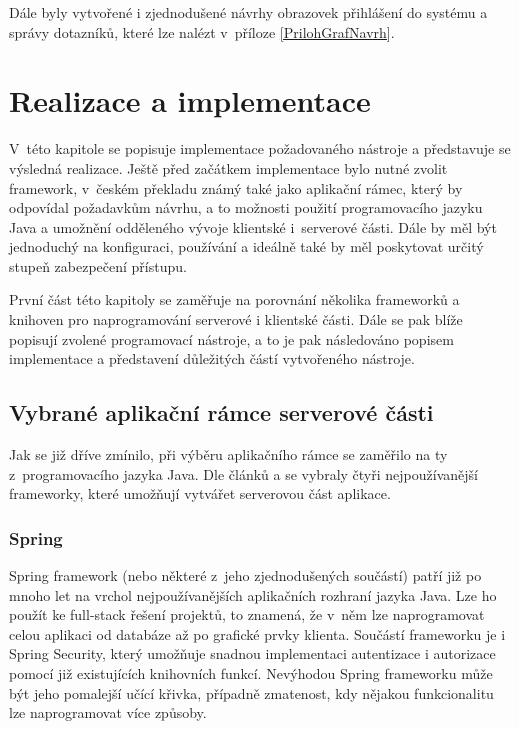 Dále byly vytvořené i zjednodušené návrhy obrazovek přihlášení do systému a správy dotazníků, které lze nalézt v~příloze \ref{PrilohGrafNavrh}.
    
\chapter{Realizace a implementace}
\label{implementace}

V~této kapitole se popisuje implementace požadovaného nástroje a představuje se výsledná realizace. Ještě před začátkem implementace bylo nutné zvolit framework, v~českém překladu známý také jako aplikační rámec, který by odpovídal požadavkům návrhu, a to možnosti použití programovacího jazyku Java a umožnění odděleného vývoje klientské i~serverové části. Dále by měl být jednoduchý na konfiguraci, používání a ideálně také by měl poskytovat určitý stupeň zabezpečení přístupu. 

První část této kapitoly se zaměřuje na porovnání několika frameworků a knihoven pro naprogramování serverové i klientské části. Dále se pak blíže popisují zvolené programovací nástroje, a to je pak následováno popisem implementace a představení důležitých částí vytvořeného nástroje. 

\section{Vybrané aplikační rámce serverové části}

Jak se již dříve zmínilo, při výběru aplikačního rámce se zaměřilo na ty z~programovacího jazyka Java. Dle článků \cite{FBackend2} a \cite{FBackend1} se vybraly čtyři nejpoužívanější frameworky, které umožňují vytvářet serverovou část aplikace.

\subsection{Spring}

Spring framework (nebo některé z~jeho zjednodušených součástí) patří již po mnoho let na vrchol nejpoužívanějších aplikačních rozhraní jazyka Java. Lze ho použít ke full-stack řešení projektů, to znamená, že v~něm lze naprogramovat celou aplikaci od databáze až po grafické prvky klienta. Součástí frameworku je i Spring Security, který umožňuje snadnou implementaci autentizace i autorizace pomocí již existujících knihovních funkcí. Nevýhodou Spring frameworku může být jeho pomalejší učící křivka, případně zmatenost, kdy nějakou funkcionalitu lze naprogramovat více způsoby.

